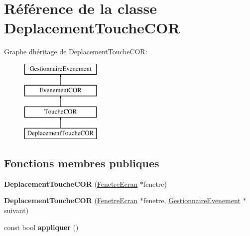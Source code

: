 \hypertarget{class_deplacement_touche_c_o_r}{}\section{Référence de la classe Deplacement\+Touche\+C\+OR}
\label{class_deplacement_touche_c_o_r}
Graphe d\textquotesingle{}héritage de Deplacement\+Touche\+C\+OR\+:\begin{figure}[H]
\begin{center}
\leavevmode
\includegraphics[height=4.000000cm]{class_deplacement_touche_c_o_r}
\end{center}
\end{figure}
\subsection*{Fonctions membres publiques}
\begin{DoxyCompactItemize}
\item 
\mbox{\label{class_deplacement_touche_c_o_r_a8c54d6d19173c53901a385ae85c7314e}} 
{\bfseries Deplacement\+Touche\+C\+OR} (\mbox{\hyperlink{class_fenetre_ecran}{Fenetre\+Ecran}} $\ast$fenetre)
\item 
\mbox{\label{class_deplacement_touche_c_o_r_a2664d56cc38a4827a3ffa328103dd598}} 
{\bfseries Deplacement\+Touche\+C\+OR} (\mbox{\hyperlink{class_fenetre_ecran}{Fenetre\+Ecran}} $\ast$fenetre, \mbox{\hyperlink{class_gestionnaire_evenement}{Gestionnaire\+Evenement}} $\ast$suivant)
\item 
\mbox{\label{class_deplacement_touche_c_o_r_a1942889cdb9c0de04cb026740d44d8cd}} 
const bool {\bfseries appliquer} ()
\end{DoxyCompactItemize}
